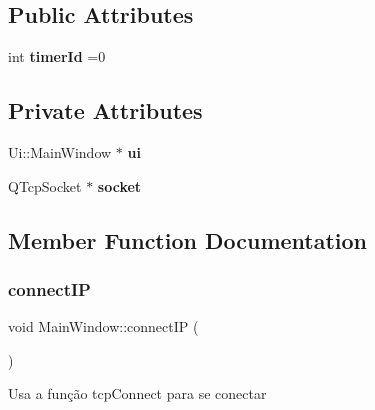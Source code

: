 \subsection*{Public Attributes}
\begin{DoxyCompactItemize}
\item 
\mbox{\label{class_main_window_a85952cd6845ef987fd9e7f84dd61eafb}} 
int {\bfseries timer\+Id} =0
\end{DoxyCompactItemize}
\subsection*{Private Attributes}
\begin{DoxyCompactItemize}
\item 
\mbox{\label{class_main_window_a35466a70ed47252a0191168126a352a5}} 
Ui\+::\+Main\+Window $\ast$ {\bfseries ui}
\item 
\mbox{\label{class_main_window_af85cfe62c116f8d2f2021e5411b0356e}} 
Q\+Tcp\+Socket $\ast$ {\bfseries socket}
\end{DoxyCompactItemize}


\subsection{Member Function Documentation}
\mbox{\label{class_main_window_a3dedcc90ba3cf2adc939aacc2ed6f5d5}} 
\subsubsection{\texorpdfstring{connect\+IP}{connectIP}}
{\footnotesize\ttfamily void Main\+Window\+::connect\+IP (\begin{DoxyParamCaption}{ }\end{DoxyParamCaption})\hspace{0.3cm}{\ttfamily [slot]}}

Usa a função tcp\+Connect para se conectar \mbox{\label{class_main_window_afb05203d61eba043eebcf3d85dd880cf}} 
